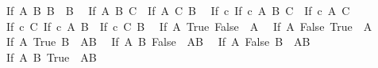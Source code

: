 \begin{isabellebody}
\ \ {\isacartoucheopen}{\isacharparenleft}{\kern0pt}If\ A{\isacharprime}{\kern0pt}\ B\ B{\isacharparenright}{\kern0pt}\ {\isacharequal}{\kern0pt}\ B{\isacartoucheclose}\isanewline
\ \ {\isacartoucheopen}{\isacharparenleft}{\kern0pt}If\ {\isacharparenleft}{\kern0pt}{\isasymnot}A{\isacharprime}{\kern0pt}{\isacharparenright}{\kern0pt}\ B\ C{\isacharparenright}{\kern0pt}\ {\isacharequal}{\kern0pt}\ {\isacharparenleft}{\kern0pt}If\ A{\isacharprime}{\kern0pt}\ C\ B{\isacharparenright}{\kern0pt}{\isacartoucheclose}\isanewline
\ \ {\isacartoucheopen}{\isacharparenleft}{\kern0pt}If\ c\ {\isacharparenleft}{\kern0pt}If\ c\ A\ B{\isacharparenright}{\kern0pt}\ C{\isacharparenright}{\kern0pt}\ {\isacharequal}{\kern0pt}\ {\isacharparenleft}{\kern0pt}If\ c\ A\ C{\isacharparenright}{\kern0pt}{\isacartoucheclose}\isanewline
\ \ {\isacartoucheopen}{\isacharparenleft}{\kern0pt}If\ c\ C\ {\isacharparenleft}{\kern0pt}If\ c\ A\ B{\isacharparenright}{\kern0pt}{\isacharparenright}{\kern0pt}\ {\isacharequal}{\kern0pt}\ {\isacharparenleft}{\kern0pt}If\ c\ C\ B{\isacharparenright}{\kern0pt}{\isacartoucheclose}\isanewline
\ \ {\isacartoucheopen}{\isacharparenleft}{\kern0pt}If\ A{\isacharprime}{\kern0pt}\ True\ False{\isacharparenright}{\kern0pt}\ {\isacharequal}{\kern0pt}\ A{\isacharprime}{\kern0pt}{\isacartoucheclose}\isanewline
\ \ {\isacartoucheopen}{\isacharparenleft}{\kern0pt}If\ A{\isacharprime}{\kern0pt}\ False\ True{\isacharparenright}{\kern0pt}\ {\isasymlongleftrightarrow}\ {\isasymnot}A{\isacharprime}{\kern0pt}{\isacartoucheclose}\isanewline
\ \ {\isacartoucheopen}{\isacharparenleft}{\kern0pt}If\ A{\isacharprime}{\kern0pt}\ True\ B{\isacharprime}{\kern0pt}{\isacharparenright}{\kern0pt}\ {\isasymlongleftrightarrow}\ A{\isacharprime}{\kern0pt}{\isasymor}B{\isacharprime}{\kern0pt}{\isacartoucheclose}\isanewline
\ \ {\isacartoucheopen}{\isacharparenleft}{\kern0pt}If\ A{\isacharprime}{\kern0pt}\ B{\isacharprime}{\kern0pt}\ False{\isacharparenright}{\kern0pt}\ {\isasymlongleftrightarrow}\ A{\isacharprime}{\kern0pt}{\isasymand}B{\isacharprime}{\kern0pt}{\isacartoucheclose}\isanewline
\ \ {\isacartoucheopen}{\isacharparenleft}{\kern0pt}If\ A{\isacharprime}{\kern0pt}\ False\ B{\isacharprime}{\kern0pt}{\isacharparenright}{\kern0pt}\ {\isasymlongleftrightarrow}\ {\isasymnot}A{\isacharprime}{\kern0pt}{\isasymand}B{\isacharprime}{\kern0pt}{\isacartoucheclose}\isanewline
\ \ {\isacartoucheopen}{\isacharparenleft}{\kern0pt}If\ A{\isacharprime}{\kern0pt}\ B{\isacharprime}{\kern0pt}\ True{\isacharparenright}{\kern0pt}\ {\isasymlongleftrightarrow}\ {\isasymnot}A{\isacharprime}{\kern0pt}{\isasymor}B{\isacharprime}{\kern0pt}{\isacartoucheclose}\isanewline

\end{isabellebody}

